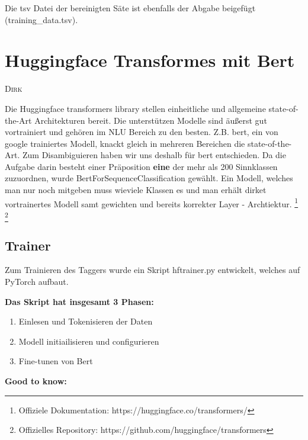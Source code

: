 \documentclass[10pt,a4paper]{article}
\newcommand{\chapterauthor}[1]{%
	{\parindent0pt\vspace*{-5pt}\hspace*{\fill}%
  \linespread{1.1}\large\scshape#1%
  \par\nobreak\vspace*{10pt}}
}
\begin{document}
Die tsv Datei der bereinigten Säte ist ebenfalls der Abgabe beigefügt (training\_data.tsv).


\section{Huggingface Transformes mit Bert}
\chapterauthor{Dirk}
Die Huggingface transformers library stellen einheitliche und allgemeine state-of-the-Art Architekturen bereit. Die unterstützen Modelle sind äußerst gut vortrainiert und gehören im NLU Bereich zu den besten. Z.B. bert, ein von google trainiertes Modell, knackt gleich in mehreren Bereichen die state-of-the-Art. Zum Disambiguieren haben wir uns deshalb für bert entschieden. Da die Aufgabe darin besteht einer Präposition \textbf{eine} der mehr als 200 Sinnklassen zuzuordnen, wurde BertForSequenceClassification gewählt. Ein Modell, welches man nur noch mitgeben muss wieviele Klassen es und man erhält dirket vortrainertes Modell samt gewichten und bereits korrekter Layer - Archtiektur. \footnote{Offiziele Dokumentation: https://huggingface.co/transformers/} \footnote{Offizielles Repository: https://github.com/huggingface/transformers}

\subsection{Trainer}
Zum Trainieren des Taggers wurde ein Skript hftrainer.py entwickelt, welches auf PyTorch aufbaut.

\vspace{0.25cm}
\textbf{Das Skript hat insgesamt 3 Phasen:}

\begin{enumerate}
	\item Einlesen und Tokenisieren der Daten
	\item Modell initiailisieren und configurieren
	\item Fine-tunen von Bert
\end{enumerate}


\textbf{Good to know:}
\end{document}
